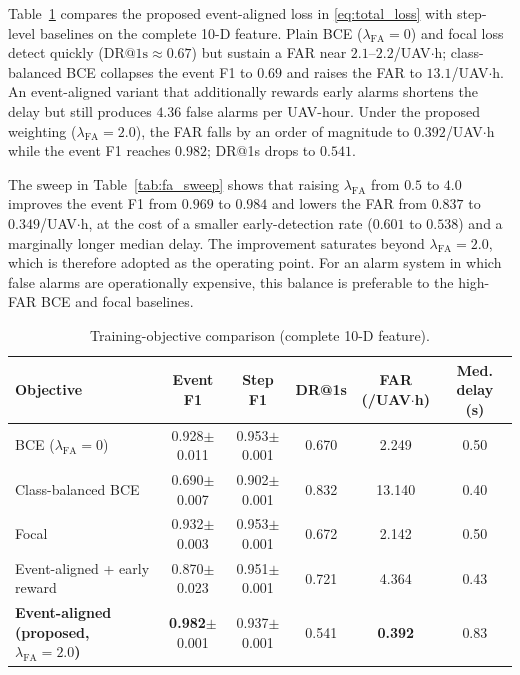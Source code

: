 Table~\ref{tab:loss_objective} compares the proposed event-aligned loss in
\eqref{eq:total_loss} with step-level baselines on the complete 10-D
feature. Plain BCE ($\lambda_{\mathrm{FA}}{=}0$) and focal loss detect
quickly ($\mathrm{DR@1s}{\approx}0.67$) but sustain a FAR near
$2.1$--$2.2$/UAV$\cdot$h; class-balanced BCE collapses the event F1 to $0.69$
and raises the FAR to $13.1$/UAV$\cdot$h. An event-aligned variant that
additionally rewards early alarms shortens the delay but still produces
$4.36$ false alarms per UAV-hour. Under the proposed weighting
($\lambda_{\mathrm{FA}}{=}2.0$), the FAR falls by an order of magnitude to
$0.392$/UAV$\cdot$h while the event F1 reaches $0.982$; DR@1s drops to
$0.541$.

The sweep in Table~\ref{tab:fa_sweep} shows that raising $\lambda_{\mathrm{FA}}$
from $0.5$ to $4.0$ improves the event F1 from $0.969$ to $0.984$ and lowers
the FAR from $0.837$ to $0.349$/UAV$\cdot$h, at the cost of a smaller
early-detection rate ($0.601$ to $0.538$) and a marginally longer median
delay. The improvement saturates beyond $\lambda_{\mathrm{FA}}{=}2.0$, which
is therefore adopted as the operating point. For an alarm system in which
false alarms are operationally expensive, this balance is preferable to the
high-FAR BCE and focal baselines.

\begin{table}[htbp]
  \centering
  \caption{Training-objective comparison (complete 10-D feature).}
  \label{tab:loss_objective}
  \begin{tabular}{lcccc c}
    \toprule
    Objective & Event F1 & Step F1 & DR@1s & FAR (/UAV$\cdot$h) & Med. delay (s) \\
    \midrule
    BCE ($\lambda_{\mathrm{FA}}{=}0$)       & 0.928$\pm$0.011 & 0.953$\pm$0.001 & 0.670 & 2.249 & 0.50 \\
    Class-balanced BCE                     & 0.690$\pm$0.007 & 0.902$\pm$0.001 & 0.832 & 13.140 & 0.40 \\
    Focal                                  & 0.932$\pm$0.003 & 0.953$\pm$0.001 & 0.672 & 2.142 & 0.50 \\
    Event-aligned + early reward           & 0.870$\pm$0.023 & 0.951$\pm$0.001 & 0.721 & 4.364 & 0.43 \\
    \textbf{Event-aligned (proposed, $\lambda_{\mathrm{FA}}{=}2.0$)} &
      \textbf{0.982}$\pm$0.001 & 0.937$\pm$0.001 & 0.541 & \textbf{0.392} & 0.83 \\
    \bottomrule
  \end{tabular}
\end{table}

